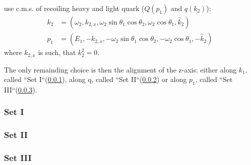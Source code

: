 use c.m.s. of recoiling heavy and light quark ($Q(p_1)$ and $q(k_2)$):
\begin{align}
k_2 &= (\omega_2,k_{2,x},\omega_2\sin\theta_1\cos\theta_2,\omega_2\cos\theta_1, \hat k_2)\\
p_1 &= (E_1,-k_{2,x},-\omega_2\sin\theta_1\cos\theta_2,-\omega_2\cos\theta_1, -\hat k_2)
\end{align}
where $k_{2,x}$ is such, that $k_2^2=0$.

The only remainding choice is then the alignment of the z-axis: either along $k_1$, called ``Set I``(\ref{sec:Phasespace.2to3.Framework.SetI}), along q, called ``Set II``(\ref{sec:Phasespace.2to3.Framework.SetII}) or along $p_1$, called ``Set III``(\ref{sec:Phasespace.2to3.Framework.SetIII}).

\subsubsection{Set I}
\label{sec:Phasespace.2to3.Framework.SetI}


\subsubsection{Set II}
\label{sec:Phasespace.2to3.Framework.SetII}


\subsubsection{Set III}
\label{sec:Phasespace.2to3.Framework.SetIII}

